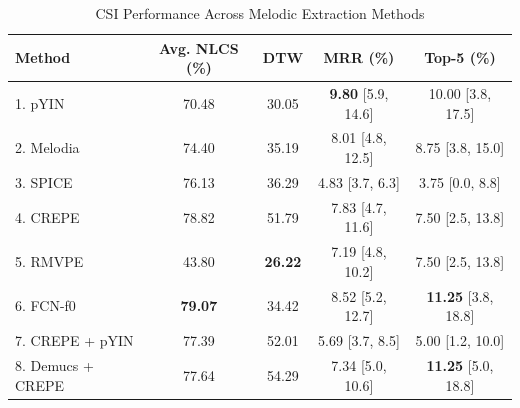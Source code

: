 \begin{table}[h!]
\centering
\caption{CSI Performance Across Melodic Extraction Methods}
\label{tab:ciarp_table2}
\begin{tabular}{|l|c|c|c|c|}
\hline
\textbf{Method} & \textbf{Avg. NLCS (\%)} & \textbf{DTW} & \textbf{MRR (\%)} & \textbf{Top-5 (\%)} \\
\hline
1. pYIN & 70.48 & 30.05 & \textbf{9.80} [5.9, 14.6] & 10.00 [3.8, 17.5] \\
2. Melodia & 74.40 & 35.19 & 8.01 [4.8, 12.5] & 8.75 [3.8, 15.0] \\
3. SPICE & 76.13 & 36.29 & 4.83 [3.7, 6.3] & 3.75 [0.0, 8.8] \\
4. CREPE & 78.82 & 51.79 & 7.83 [4.7, 11.6] & 7.50 [2.5, 13.8] \\
5. RMVPE & 43.80 & \textbf{26.22} & 7.19 [4.8, 10.2] & 7.50 [2.5, 13.8] \\
6. FCN-f0 & \textbf{79.07} & 34.42 & 8.52 [5.2, 12.7] & \textbf{11.25} [3.8, 18.8] \\
7. CREPE + pYIN & 77.39 & 52.01 & 5.69 [3.7, 8.5] & 5.00 [1.2, 10.0] \\
8. Demucs + CREPE & 77.64 & 54.29 & 7.34 [5.0, 10.6] & \textbf{11.25} [5.0, 18.8] \\
\hline
\end{tabular}
\end{table}
